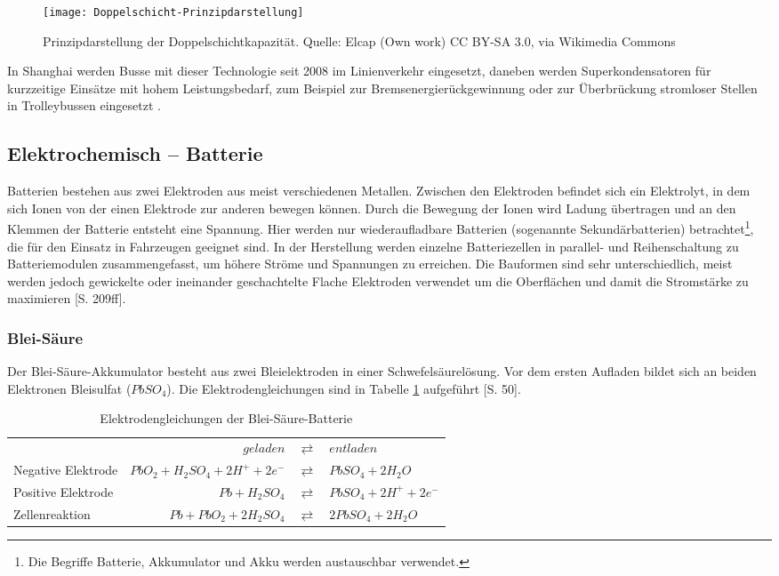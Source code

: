 \begin{figure}\centering
	 \texttt{[image: Doppelschicht-Prinzipdarstellung]}
	 \caption{Prinzipdarstellung der Doppelschichtkapazität. Quelle: Elcap (Own work) CC BY-SA 3.0, via Wikimedia Commons}
	 \label{abb_doppelschicht}
\end{figure}

In Shanghai werden Busse mit dieser Technologie seit 2008 im Linienverkehr eingesetzt, daneben werden Superkondensatoren für kurzzeitige Einsätze mit hohem Leistungsbedarf, zum Beispiel zur Bremsenergierückgewinnung oder zur Überbrückung stromloser Stellen in Trolleybussen eingesetzt \cite{Barminer-Busgesellschaft:2012}.

\subsection{Elektrochemisch – Batterie} %
Batterien bestehen aus zwei Elektroden aus meist verschiedenen Metallen. Zwischen den Elektroden befindet sich ein Elektrolyt, in dem sich Ionen von der einen Elektrode zur anderen bewegen können. Durch die Bewegung der Ionen wird Ladung übertragen und an den Klemmen der Batterie entsteht eine Spannung. Hier werden nur wiederaufladbare Batterien (sogenannte Sekundärbatterien) betrachtet\footnote{Die Begriffe Batterie, Akkumulator und Akku werden austauschbar verwendet.}, die für den Einsatz in Fahrzeugen geeignet sind. In der Herstellung werden einzelne Batteriezellen in parallel- und Reihenschaltung zu Batteriemodulen zusammengefasst, um höhere Ströme und Spannungen zu erreichen. Die Bauformen sind sehr unterschiedlich, meist werden jedoch gewickelte oder ineinander geschachtelte Flache Elektroden verwendet um die Oberflächen und damit die Stromstärke zu maximieren \cite{Sterner:2014}[S. 209ff].

\subsubsection{Blei-Säure}
Der Blei-Säure-Akkumulator besteht aus zwei Bleielektroden in einer Schwefelsäurelösung. Vor dem ersten Aufladen bildet sich an beiden Elektronen Bleisulfat ($PbSO_4$). Die Elektrodengleichungen sind in Tabelle \ref{Pb} aufgeführt \cite{KiehneBattery}[S. 50].

\begin{table}\centering
  \begin{tabularx}{\linewidth}{XrcX}
  	                   &                       $geladen$ & $\rightleftarrows$ & $entladen$             \\
  	Negative Elektrode & $PbO_2 + H_2SO_4 + 2H^+ + 2e^-$ & $\rightleftarrows$ & $PbSO_4 + 2H_2O$       \\
  	Positive Elektrode &                  $Pb + H_2SO_4$ & $\rightleftarrows$ & $PbSO_4 + 2H^+ + 2e^-$ \\ \midrule
  	Zellenreaktion     &         $Pb + PbO_2 + 2H_2SO_4$ & $\rightleftarrows$ & $2PbSO_4 + 2H_2O$      \\
  \end{tabularx}
  \caption{Elektrodengleichungen der Blei-Säure-Batterie}
  \label{Pb}
\end{table}

